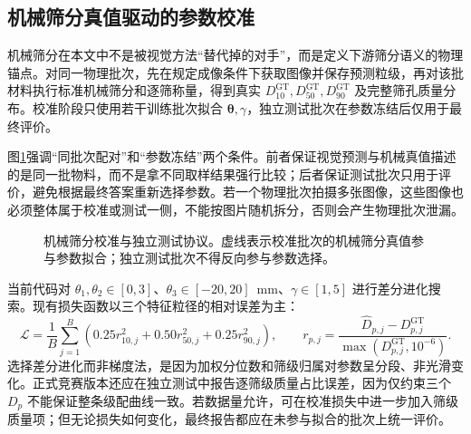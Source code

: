 \subsection{机械筛分真值驱动的参数校准}

机械筛分在本文中不是被视觉方法“替代掉的对手”，而是定义下游筛分语义的物理锚点。对同一物理批次，先在规定成像条件下获取图像并保存预测粒级，再对该批材料执行标准机械筛分和逐筛称量，得到真实 $D_{10}^{\mathrm{GT}},D_{50}^{\mathrm{GT}},D_{90}^{\mathrm{GT}}$ 及完整筛孔质量分布。校准阶段只使用若干训练批次拟合 $\boldsymbol{\theta},\gamma$，独立测试批次在参数冻结后仅用于最终评价。

图\ref{fig:r-calibration-loop}强调“同批次配对”和“参数冻结”两个条件。前者保证视觉预测与机械真值描述的是同一批物料，而不是拿不同取样结果强行比较；后者保证测试批次只用于评价，避免根据最终答案重新选择参数。若一个物理批次拍摄多张图像，这些图像也必须整体属于校准或测试一侧，不能按图片随机拆分，否则会产生物理批次泄漏。

\begin{figure}[t]
\centering
{}
\caption{机械筛分校准与独立测试协议。虚线表示校准批次的机械筛分真值参与参数拟合；独立测试批次不得反向参与参数选择。}
\label{fig:r-calibration-loop}
\end{figure}

当前代码对 $\theta_1,\theta_2\in[0,3]$、$\theta_3\in[-20,20]$~mm、$\gamma\in[1,5]$ 进行差分进化搜索。现有损失函数以三个特征粒径的相对误差为主：
\begin{equation}
\mathcal{L}=\frac{1}{B}\sum_{j=1}^{B}
\left(0.25r_{10,j}^2+0.50r_{50,j}^2+0.25r_{90,j}^2\right),\qquad
r_{p,j}=\frac{\widehat D_{p,j}-D_{p,j}^{\mathrm{GT}}}{\max(D_{p,j}^{\mathrm{GT}},10^{-6})}.
\label{eq:r-cal-loss}
\end{equation}
选择差分进化而非梯度法，是因为加权分位数和筛级归属对参数呈分段、非光滑变化。正式竞赛版本还应在独立测试中报告逐筛级质量占比误差，因为仅约束三个 $D_p$ 不能保证整条级配曲线一致。若数据量允许，可在校准损失中进一步加入筛级质量项；但无论损失如何变化，最终报告都应在未参与拟合的批次上统一评价。


